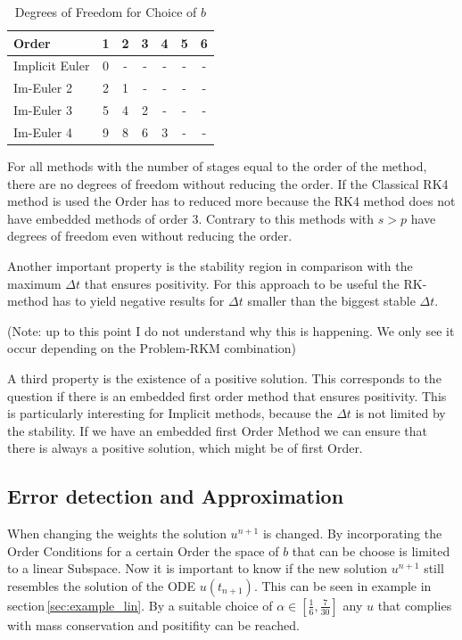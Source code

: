 \documentclass{article}
\begin{document}
 \begin{table}[h!]
\centering   %
 \begin{tabular}{|l |c c c c c c |} 
 \hline 
Order &1&2&3&4&5&6 \\ 
 \hline Implicit Euler&0& - & - & - & - & -  \\ 
 Im-Euler 2&2&1& - & - & - & -  \\ 
 Im-Euler 3&5&4&2& - & - & -  \\ 
 Im-Euler 4&9&8&6&3& - & -  \\ 
 \hline 
 \end{tabular}
 \caption{Degrees of Freedom for Choice of $b$} %
 \label{table:DOF_imp}
 \end{table}


For all methods with the number of stages equal to the order of the method, there are no degrees of freedom without reducing the order. 
If the Classical RK4 method is used the Order has to reduced more because the RK4 method does not have embedded methods of order 3.
Contrary to this methods with $s > p$ have degrees of freedom even without reducing the order. 

Another important property is the stability region in comparison with the maximum $\Delta t$ that ensures positivity. For this approach to be useful the RK-method has to yield negative results for $\Delta t$ smaller than the biggest stable $\Delta t$.

(Note: up to this point I do not understand why this is happening. We only see it occur depending on the Problem-RKM combination)

A third property is the existence of a positive solution. This corresponds to the question if there is an embedded first order method that ensures positivity. This is particularly interesting for Implicit methods, because the $\Delta t$ is not limited by the stability. 
If we have an embedded first Order Method we can ensure that there is always a positive solution, which might be of first Order. 

\subsection{Error detection and Approximation}
When changing the weights the solution $u^{n+1}$ is changed. 
By incorporating the Order Conditions for a certain Order the space of $b$ that can be choose is limited to a linear Subspace. 
Now it is important to know if the new solution $u^{n+1}$ still resembles the solution of the ODE $u(t_{n+1})$. 
This can be seen in example in section\,\ref{sec:example_lin}.
By a suitable choice of $\alpha \in [\frac{1}{6},\frac{7}{30}]$ any $u$ that complies with mass conservation and positifity can be reached. 
\end{document}
